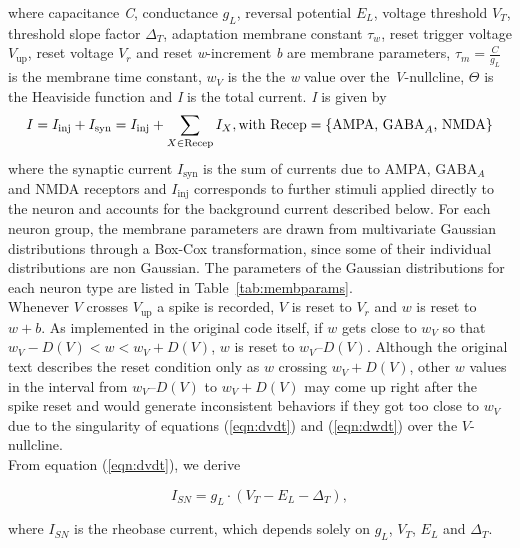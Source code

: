 where capacitance \textit{C}, conductance $g_L$, reversal potential $E_L$, voltage threshold $V_T$, threshold slope factor $\Delta_T$, adaptation membrane constant $\tau_w$, reset trigger voltage $V_{\text{up}}$, reset voltage $V_r$ and reset \textit{w}-increment \textit{b} are membrane parameters, $\tau_m = \frac{C}{g_L}$ is the membrane time constant, $w_V$ is the the \textit{w} value over the \textit{V}-nullcline, $\Theta$ is the Heaviside function and \textit{I} is the total current. \textit{I} is given by
\begin{equation}
I = I_{\text{inj}} + I_{\text{syn}} = I_{\text{inj}} + \sum_{X \in \text{Recep}} I_X, \text{ \\with } \text{Recep} = \{\text{AMPA, GABA}_A\text{, NMDA}\}
\label{eqn:currents}
\end{equation}
where the synaptic current $I_{\text{syn}}$ is the sum of currents due to AMPA, GABA$_A$ and NMDA receptors and $I_{\text{inj}}$ corresponds to further stimuli applied directly to the neuron and accounts for the background current described below. For each neuron group, the membrane parameters are drawn from multivariate Gaussian distributions through a Box-Cox transformation, since some of their individual distributions are non Gaussian. The parameters of the Gaussian distributions for each neuron type are listed in Table~\ref{tab:membparams}.\\

Whenever $V$ crosses $V_{\text{up}}$ a spike is recorded, $V$ is reset to $V_r$ and  $w$ is reset to $w + b$. As implemented in the original code itself, if $w$ gets close to $w_V$ so that $w_V - D(V) < w < w_V + D(V)$, $w$ is reset to $w_V – D(V)$. Although the original text describes the reset condition only as $w$ crossing $w_V + D(V)$, other $w$ values in the interval from $w_V – D(V)$ to $w_V + D(V)$ may come up right after the spike reset and would generate inconsistent behaviors if they got too close to $w_V$ due to the singularity of equations (\ref{eqn:dvdt}) and (\ref{eqn:dwdt}) over the $V$-nullcline.\\

From equation (\ref{eqn:dvdt}), we derive

\begin{equation}
I_{SN} = g_L \cdot (V_T - E_L - \Delta_T), 
\label{eqn:rheobase}
\end{equation}

where $I_{SN}$ is the rheobase current, which depends solely on $g_L$, $V_T$, $E_L$ and $\Delta_T$.\\

